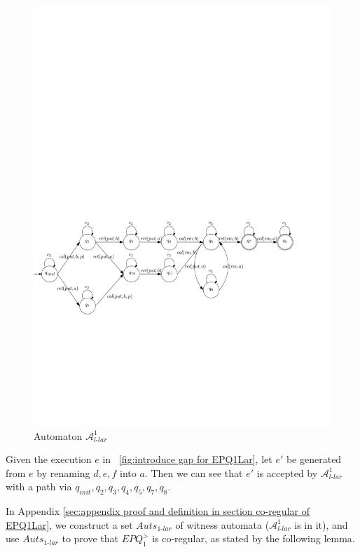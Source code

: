 \begin{figure}[htbp]
  \centering
  \includegraphics[width=1 \textwidth]{figures/PIC_AUTO_PQ1Lar-pprr.pdf}
  \caption{Automaton $\mathcal{A}_{\textit{l-lar}}^1$}
  \label{fig:automata APQ1Lar-1}
\end{figure}

Given the execution $e$ in \figurename~\ref{fig:introduce gap for EPQ1Lar}, let $e'$ be generated from $e$ by renaming $d,e,f$ into $a$. Then we can see that $e'$ is accepted by $\mathcal{A}_{\textit{l-lar}}^1$ with a path via $q_{\textit{init}}, q_2, q_3, q_4,q_5,q_7,q_8$.

In Appendix \ref{sec:appendix proof and definition in section co-regular of EPQ1Lar}, we construct a set $\textit{Auts}_{\textit{1-lar}}$ of witness automata ($\mathcal{A}_{\textit{l-lar}}^1$ is in it), and use $\textit{Auts}_{\textit{1-lar}}$ to prove that $\textit{EPQ}_1^{>}$ is co-regular, as stated by the following lemma.

